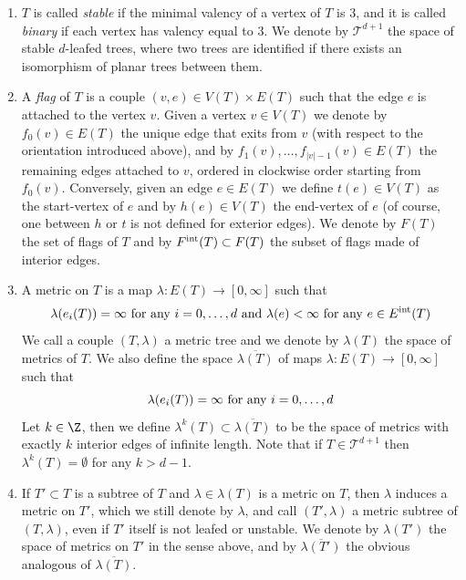 \begin{dfn}
\begin{enumerate}
		\item $T$ is called \textit{stable} if the minimal valency of a vertex of $T$ is $3$, and it is called \textit{binary} if each vertex has valency equal to $3$. We denote by $\mathcal{T}^{d+1}$ the space of stable $d$-leafed trees, where two trees are identified if there exists an isomorphism of planar trees between them.
		\item A \textit{flag} of $T$ is a couple $(v,e)\in V(T)\times E(T)$ such that the edge $e$ is attached to the vertex $v$. Given a vertex $v\in V(T)$ we denote by $f_0(v)\in E(T)$ the unique edge that exits from $v$ (with respect to the orientation introduced above), and by $f_1(v),\ldots,f_{|v|-1}(v)\in E(T)$ the remaining edges attached to $v$, ordered in clockwise order starting from $f_0(v)$. Conversely, given an edge $e\in E(T)$ we define $t(e)\in V(T)$ as the start-vertex of $e$ and by $h(e)\in V(T)$ the end-vertex of $e$ (of course, one between $h$ or $t$ is not defined for exterior edges). We denote by $F(T)$ the set of flags of $T$ and by $F^\textnormal{int}(T)\subset F(T)$ the subset of flags made of interior edges. 
		\item A metric on $T$ is a map $\lambda: E(T)\to [0,\infty]$ such that  $$\lambda(e_i(T))=\infty \textnormal{ for any }i=0,\ldots,d \textnormal{   and   } \lambda(e)<\infty \textnormal{ for any }e\in E^\textnormal{int}(T)$$ We call a couple $(T,\lambda)$ a metric tree and we denote by $\lambda(T)$ the space of metrics of $T$. We also define the space $\overline{\lambda(T)}$ of maps $\lambda:E(T)\to [0,\infty]$ such that $$\lambda(e_i(T))=\infty \textnormal{ for any }i=0,\ldots,d$$ Let $k\in \Z$, then we define $\lambda^k(T)\subset \overline{\lambda(T)}$ to be the space of metrics with exactly $k$ interior edges of infinite length. Note that if $T\in \mathcal{T}^{d+1}$ then $\lambda^k(T)=\emptyset$ for any $k>d-1$.
		\item If $T'\subset T$ is a subtree of $T$ and $\lambda\in \lambda(T)$ is a metric on $T$, then $\lambda$ induces a metric on $T'$, which we still denote by $\lambda$, and call $(T',\lambda)$ a metric subtree of $(T,\lambda)$, even if $T'$ itself is not leafed or unstable. We denote by $\lambda(T')$ the space of metrics on $T'$ in the sense above, and by $\overline{\lambda(T')}$ the obvious analogous of $\overline{\lambda(T)}$.\\
	\end{enumerate}
\end{dfn}

